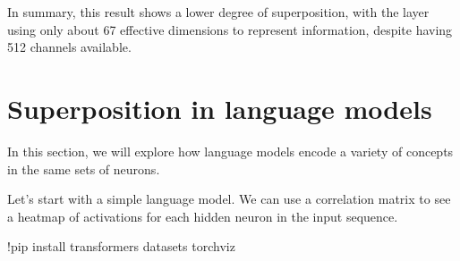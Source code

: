 \documentclass[
  letterpaper,
  DIV=11,
  numbers=noendperiod]{scrreprt}
\newenvironment{Shaded}{\begin{snugshade}}{\end{snugshade}}
\newcommand{\NormalTok}[1]{\textcolor[rgb]{0.00,0.23,0.31}{#1}}
\newcommand{\OperatorTok}[1]{\textcolor[rgb]{0.37,0.37,0.37}{#1}}
\begin{document}
In summary, this result shows a lower degree of superposition, with the
layer using only about 67 effective dimensions to represent information,
despite having 512 channels available.


\chapter{Superposition in language
models}\label{superposition-in-language-models}

In this section, we will explore how language models encode a variety of
concepts in the same sets of neurons.

Let's start with a simple language model. We can use a correlation
matrix to see a heatmap of activations for each hidden neuron in the
input sequence.

\begin{Shaded}
\begin{Highlighting}[]
\OperatorTok{!}\NormalTok{pip install transformers datasets torchviz}
\end{Highlighting}
\end{Shaded}
\end{document}
